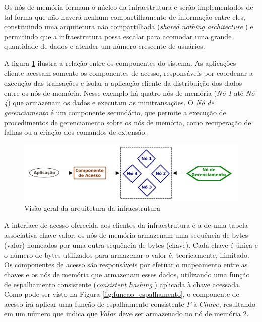 \documentclass[11pt,twoside,a4paper]{book}
\begin{document}
Os nós de memória formam o núcleo da infraestrutura e serão implementados de tal forma que não haverá nenhum compartilhamento de informação entre eles, constituindo uma arquitetura não compartilhada (\emph{shared nothing architecture} \cite{shared_nothing}) e permitindo que a infraestrutura possa escalar para acomodar uma grande quantidade de dados e atender um número crescente de usuários.

A figura \ref{fig:overview_arquitetura} ilustra a relação entre os componentes do sistema. As aplicações cliente acessam somente os componentes de acesso, responsáveis por coordenar a execução das transações e isolar a aplicação cliente da distribuição dos dados entre os nós de memória. Nesse exemplo há quatro nós de memória (\emph{Nó 1} até \emph{Nó 4}) que armazenam os dados e executam as minitransações. O \emph{Nó de gerenciamento} é um componente secundário, que permite a execução de procedimentos de gerenciamento sobre os nós de memória, como recuperação de falhas ou a criação dos comandos de extensão.

\begin{figure}
  \centering
  \includegraphics[width=.90\textwidth]{overview_arquitetura} 
  \caption{Visão geral da arquitetura da infraestrutura}
  \label{fig:overview_arquitetura} 
\end{figure}

A interface de acesso oferecida aos clientes da infraestrutura é a de uma tabela associativa chave-valor: os nós de memória armazenam uma sequência de bytes (valor) nomeados por uma outra sequência de bytes (chave). Cada chave é única e o número de bytes utilizados para armazenar o valor é, teoricamente, ilimitado. Os componentes de acesso são responsáveis por efetuar o mapeamento entre as chaves e os nós de memória que armazenam esses dados, utilizando uma função de espalhamento consistente (\emph{consistent hashing} \cite{consistent_hashing}) aplicada à chave acessada. Como pode ser visto na Figura \ref{fig:funcao_espalhamento}, o componente de acesso irá aplicar uma função de espalhamento consistente \textbf{$F$} à $Chave$, resultando em um número que indica que $Valor$ deve ser armazenado no nó de memória 2. 
\end{document}
